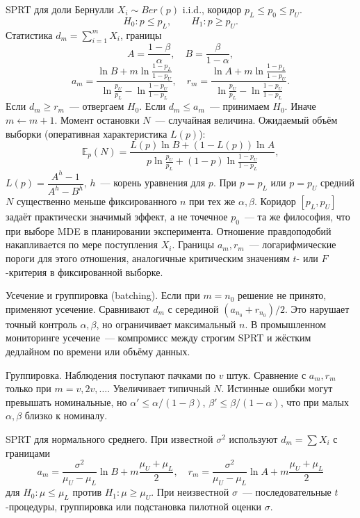 SPRT для доли Бернулли $X_i\sim Ber(p)$ i.i.d., коридор $p_L\le p_0\le p_U$.
\[ H_0\colon p\le p_L, \qquad H_1\colon p\ge p_U.
\] Статистика $d_m=\sum_{i=1}^m X_i$, границы \[ A=\frac{1-\beta}{\alpha}, \quad B=\frac{\beta}{1-\alpha}, \] \[ a_m=\frac{\ln B+m\ln\frac{1-p_L}{1-p_U}}{\ln\frac{p_U}{p_L}-\ln\frac{1-p_U}{1-p_L}}, \quad r_m=\frac{\ln A+m\ln\frac{1-p_L}{1-p_U}}{\ln\frac{p_U}{p_L}-\ln\frac{1-p_U}{1-p_L}}.
\] Если $d_m\ge r_m$~--- отвергаем $H_0$. Если $d_m\le a_m$~--- принимаем $H_0$. Иначе $m\leftarrow m+1$.
Момент остановки $N$~--- случайная величина.
Ожидаемый объём выборки (оперативная характеристика $L(p)$): \[ \mathbb{E}_p(N)=\frac{L(p)\ln B+(1-L(p))\ln A} {p\ln\frac{p_U}{p_L}+(1-p)\ln\frac{1-p_U}{1-p_L}}, \] $L(p)=\dfrac{A^h-1}{A^h-B^h}$, $h$~--- корень уравнения для $p$.
При $p=p_L$ или $p=p_U$ средний $N$ существенно меньше фиксированного $n$ при тех же $\alpha,\beta$.
Коридор $[p_L,p_U]$ задаёт практически значимый эффект, а не точечное $p_0$~--- та же философия, что при выборе MDE в планировании эксперимента.
Отношение правдоподобий накапливается по мере поступления $X_i$. Границы $a_m,r_m$~--- логарифмические пороги для этого отношения, аналогичные критическим значениям $t$- или $F$-критерия в фиксированной выборке.

Усечение и группировка (batching). Если при $m=n_0$ решение не принято, применяют усечение. Сравнивают $d_m$ с серединой $(a_{n_0}+r_{n_0})/2$.
Это нарушает точный контроль $\alpha,\beta$, но ограничивает максимальный $n$.
В промышленном мониторинге усечение~--- компромисс между строгим SPRT и жёстким дедлайном по времени или объёму данных.

Группировка. Наблюдения поступают пачками по $v$ штук. Сравнение с $a_m,r_m$ только при $m=v,2v,\ldots$.
Увеличивает типичный $N$. Истинные ошибки могут превышать номинальные, но $\alpha'\le\alpha/(1-\beta)$, $\beta'\le\beta/(1-\alpha)$, что при малых $\alpha,\beta$ близко к номиналу.

SPRT для нормального среднего. При известной $\sigma^2$ используют $d_m=\sum X_i$ с границами \[ a_m=\frac{\sigma^2}{\mu_U-\mu_L}\ln B+m\frac{\mu_U+\mu_L}{2},\quad r_m=\frac{\sigma^2}{\mu_U-\mu_L}\ln A+m\frac{\mu_U+\mu_L}{2} \] для $H_0\colon\mu\le\mu_L$ против $H_1\colon\mu\ge\mu_U$.
При неизвестной $\sigma$~--- последовательные $t$-процедуры, группировка или подстановка пилотной оценки $\sigma$.

